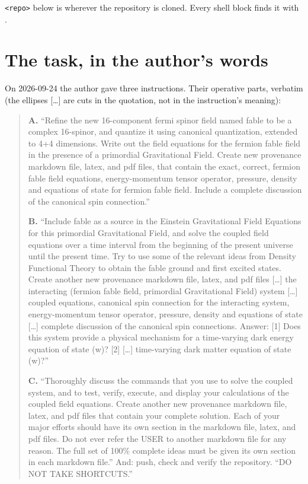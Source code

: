 \noindent\texttt{<repo>} below is wherever the repository is cloned. Every shell block finds it with
.

\setcounter{section}{-1}
\section{The task, in the author's words}
\label{sec:0}

On 2026-09-24 the author gave three instructions. Their operative parts, verbatim (the ellipses
[\dots] are cuts in the quotation, not in the instruction's meaning):

\begin{quote}
\textbf{A.} ``Refine the new 16-component fermi spinor field named fable to be a complex 16-spinor,
and quantize it using canonical quantization, extended to 4+4 dimensions. Write out the field
equations for the fermion fable field in the presence of a primordial Gravitational Field.
Create new provenance markdown file, latex, and pdf files, that contain the exact, correct,
fermion fable field equations, energy-momentum tensor operator, pressure, density and equations
of state for fermion fable field. Include a complete discussion of the canonical spin
connection.''

\textbf{B.} ``Include fable as a source in the Einstein Gravitational Field Equations for this
primordial Gravitational Field, and solve the coupled field equations over a time interval from
the beginning of the present universe until the present time. Try to use some of the relevant
ideas from Density Functional Theory to obtain the fable ground and first excited states. Create
another new provenance markdown file, latex, and pdf files [\dots] the interacting (fermion fable
field, primordial Gravitational Field) system [\dots] coupled equations, canonical spin connection
for the interacting system, energy-momentum tensor operator, pressure, density and equations of
state [\dots] complete discussion of the canonical spin connections. Answer: [1] Does this system
provide a physical mechanism for a time-varying dark energy equation of state (w)? [2] [\dots]
time-varying dark matter equation of state (w)?''

\textbf{C.} ``Thoroughly discuss the commands that you use to solve the coupled system, and to test,
verify, execute, and display your calculations of the coupled field equations. Create another
new provenance markdown file, latex, and pdf files that contain your complete solution. Each of
your major efforts should have its own section in the markdown file, latex, and pdf files. Do
not ever refer the USER to another markdown file for any reason. The full set of 100\% complete
ideas must be given its own section in each markdown file.'' And: push, check and verify the
repository. ``DO NOT TAKE SHORTCUTS.''
\end{quote}

